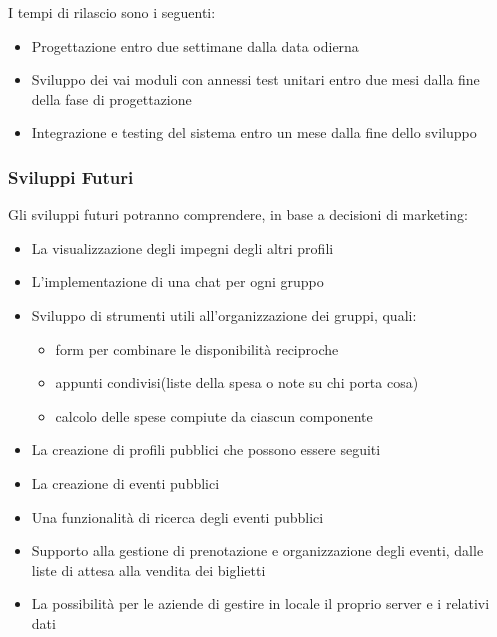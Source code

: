 I tempi di rilascio sono i seguenti:
\begin{itemize}
    \item Progettazione entro due settimane dalla data odierna
    \item Sviluppo dei vai moduli con annessi test unitari entro due mesi dalla fine della fase di progettazione
    \item Integrazione e testing del sistema entro un mese dalla fine dello sviluppo
\end{itemize}
\hfill \break

\subsubsection{Sviluppi Futuri}
Gli sviluppi futuri potranno comprendere, in base a decisioni di marketing:
\begin{itemize}
    \item La visualizzazione degli impegni degli altri profili
    \item L'implementazione di una chat per ogni gruppo
    \item Sviluppo di strumenti utili all'organizzazione dei gruppi, quali:
          \begin{itemize}
              \item form per combinare le disponibilità reciproche
              \item appunti condivisi(liste della spesa o note su chi porta cosa)
              \item calcolo delle spese compiute da ciascun componente
          \end{itemize}
    \item La creazione di profili pubblici che possono essere seguiti
    \item La creazione di eventi pubblici
    \item Una funzionalità di ricerca degli eventi pubblici
    \item Supporto alla gestione di prenotazione e organizzazione degli eventi, dalle liste di attesa alla vendita dei biglietti
    \item La possibilità per le aziende di gestire in locale il proprio server e i relativi dati
\end{itemize}

